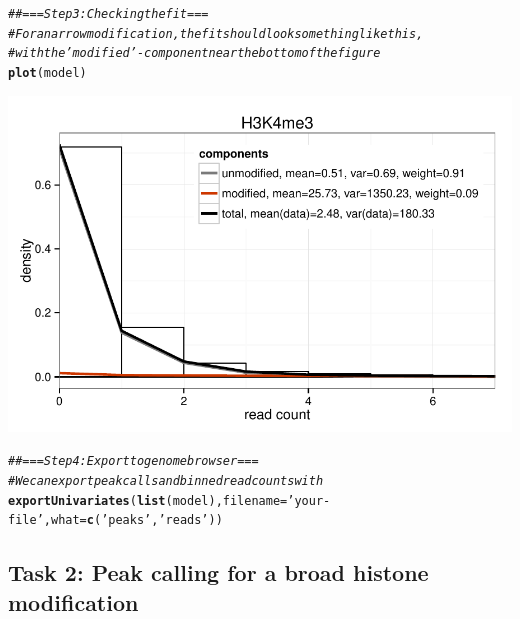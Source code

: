 \documentclass[11pt]{article}\usepackage[]{graphicx}\usepackage[]{color}
\makeatletter
\def\maxwidth{ %
  \ifdim\Gin@nat@width>\linewidth
    \linewidth
  \else
    \Gin@nat@width
  \fi
}
\newcommand{\hlstr}[1]{\textcolor[rgb]{0.192,0.494,0.8}{#1}}%
\newcommand{\hlcom}[1]{\textcolor[rgb]{0.678,0.584,0.686}{\textit{#1}}}%
\newcommand{\hlstd}[1]{\textcolor[rgb]{0.345,0.345,0.345}{#1}}%
\newcommand{\hlkwc}[1]{\textcolor[rgb]{0.333,0.667,0.333}{#1}}%
\newcommand{\hlkwd}[1]{\textcolor[rgb]{0.737,0.353,0.396}{\textbf{#1}}}%
\newenvironment{kframe}{%
 \def\at@end@of@kframe{}%
 \ifinner\ifhmode%
  \def\at@end@of@kframe{\end{minipage}}%
  \begin{minipage}{\columnwidth}%
 \fi\fi%
 \def\FrameCommand##1{\hskip\@totalleftmargin \hskip-\fboxsep
 \colorbox{shadecolor}{##1}\hskip-\fboxsep
     \hskip-\linewidth \hskip-\@totalleftmargin \hskip\columnwidth}%
 \MakeFramed {\advance\hsize-\width
   \@totalleftmargin\z@ \linewidth\hsize
   \@setminipage}}%
 {\par\unskip\endMakeFramed%
 \at@end@of@kframe}
\newenvironment{knitrout}{}{} %
\makeatother
\begin{document}
\begin{scriptsize}
\begin{knitrout}
\color{fgcolor}\begin{kframe}
\begin{alltt}
\hlcom{## === Step 3: Checking the fit ===}
\hlcom{# For a narrow modification, the fit should look something like this,}
\hlcom{# with the 'modified'-component near the bottom of the figure}
\hlkwd{plot}\hlstd{(model)}
\end{alltt}
\end{kframe}
\includegraphics[width=\maxwidth]{figure/univariate_narrow_plotting-1} 

\end{knitrout}

\begin{knitrout}
\color{fgcolor}\begin{kframe}
\begin{alltt}
\hlcom{## === Step 4: Export to genome browser ===}
\hlcom{# We can export peak calls and binned read counts with}
\hlkwd{exportUnivariates}\hlstd{(}\hlkwd{list}\hlstd{(model),} \hlkwc{filename}\hlstd{=}\hlstr{'your-file'}\hlstd{,} \hlkwc{what}\hlstd{=}\hlkwd{c}\hlstd{(}\hlstr{'peaks'}\hlstd{,}\hlstr{'reads'}\hlstd{))}
\end{alltt}
\end{kframe}
\end{knitrout}
\end{scriptsize}

\subsection{\label{sec:broad}Task 2: Peak calling for a broad histone modification}
\end{document}
